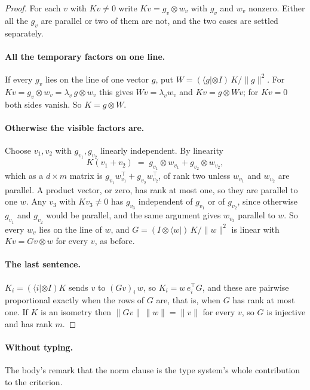\documentclass[acmsmall,screen,review,anonymous,nonacm]{acmart}
\begin{document}
\stmtProductwise
\begin{proof}
For each $v$ with $Kv \ne 0$ write $Kv = g_v \otimes w_v$ with $g_v$ and
$w_v$ nonzero. Either all the $g_v$ are parallel or two of them are not, and
the two cases are settled separately.

\paragraph{All the temporary factors on one line.} If every $g_v$ lies on the
line of one vector $g$, put $W = (\langle g| \otimes I)\,K/\|g\|^{2}$. For
$Kv = g_v \otimes w_v = \lambda_v\,g \otimes w_v$ this gives $Wv = \lambda_v
w_v$ and $Kv = g \otimes Wv$; for $Kv = 0$ both sides vanish. So $K = g
\otimes W$.

\paragraph{Otherwise the visible factors are.} Choose $v_1, v_2$ with
$g_{v_1}, g_{v_2}$ linearly independent. By linearity
\[
  K(v_1 + v_2) \;=\; g_{v_1} \otimes w_{v_1} + g_{v_2} \otimes w_{v_2} ,
\]
which as a $d \times m$ matrix is $g_{v_1}w_{v_1}^{\top} +
g_{v_2}w_{v_2}^{\top}$, of rank two unless $w_{v_1}$ and $w_{v_2}$ are
parallel. A product vector, or zero, has rank at most one, so they are
parallel to one $w$. Any $v_3$ with $Kv_3 \ne 0$ has $g_{v_3}$ independent of
$g_{v_1}$ or of $g_{v_2}$, since otherwise $g_{v_1}$ and $g_{v_2}$ would be
parallel, and the same argument gives $w_{v_3}$ parallel to $w$. So every
$w_v$ lies on the line of $w$, and $G = (I \otimes \langle
w|)\,K/\|w\|^{2}$ is linear with $Kv = Gv \otimes w$ for every $v$, as
before.

\paragraph{The last sentence.} $K_i = (\langle i| \otimes I)K$ sends $v$ to
$(Gv)_i\,w$, so $K_i = w\,e_i^{\top}G$, and these are pairwise proportional
exactly when the rows of $G$ are, that is, when $G$ has rank at most one. If
$K$ is an isometry then $\|Gv\|\,\|w\| = \|v\|$ for every $v$, so $G$ is
injective and has rank $m$.
\end{proof}

\paragraph{Without typing.} The body's remark that the norm clause is the type
system's whole contribution to the criterion.
\end{document}
